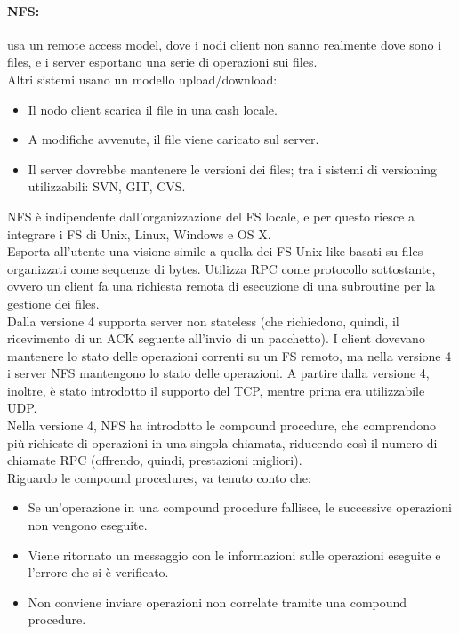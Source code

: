 \documentclass[a4paper]{report}
\begin{document}
\paragraph{NFS:} usa un remote access model, dove i nodi client non sanno realmente dove sono i files, e i server esportano una serie di operazioni sui files. \\
Altri sistemi usano un modello upload/download:
\begin{itemize}
\item Il nodo client scarica il file in una cash locale.
\item A modifiche avvenute, il file viene caricato sul server.
\item Il server dovrebbe mantenere le versioni dei files; tra i sistemi di versioning utilizzabili: SVN, GIT, CVS.
\end{itemize}
NFS è indipendente dall'organizzazione del FS locale, e per questo riesce a integrare i FS di Unix, Linux, Windows e OS X.\\
Esporta all'utente una visione simile a quella dei FS Unix-like basati su files organizzati come sequenze di bytes. Utilizza RPC come protocollo sottostante, ovvero un client fa una richiesta remota di esecuzione di una subroutine per la gestione dei files.\\
Dalla versione 4 supporta server non stateless (che richiedono, quindi, il ricevimento di un ACK seguente all'invio di un pacchetto). I client dovevano mantenere lo stato delle operazioni correnti su un FS remoto, ma nella versione 4 i server NFS mantengono lo stato delle operazioni. A partire dalla versione 4, inoltre, è stato introdotto il supporto del TCP, mentre prima era utilizzabile UDP.\\
Nella versione 4, NFS ha introdotto le compound procedure, che comprendono più richieste di operazioni in una singola chiamata, riducendo così il numero di chiamate RPC (offrendo, quindi, prestazioni migliori).\\
Riguardo le compound procedures, va tenuto conto che:
\begin{itemize}
\item Se un'operazione in una compound procedure fallisce, le successive operazioni non vengono eseguite.
\item Viene ritornato un messaggio con le informazioni sulle operazioni eseguite e l'errore che si è verificato.
\item Non conviene inviare operazioni non correlate tramite una compound procedure.
\end{itemize}
\end{document}
